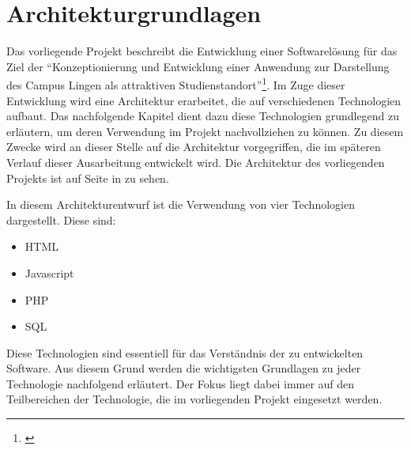 \section{Architekturgrundlagen}
\label{sec:Architekturgrundlagen}

Das vorliegende Projekt beschreibt die Entwicklung einer Softwarelösung für das
Ziel der "`Konzeptionierung und Entwicklung einer Anwendung zur Darstellung
des Campus Lingen als attraktiven
Studienstandort"'\footnote{\citet[S.~5]{unternehmensfuehrung2014}}.
Im Zuge dieser Entwicklung wird eine Architektur erarbeitet, die auf
verschiedenen Technologien aufbaut. Das nachfolgende Kapitel dient dazu diese
Technologien grundlegend zu erläutern, um deren Verwendung im Projekt
nachvollziehen zu können. Zu diesem Zwecke wird an dieser Stelle auf
die Architektur vorgegriffen, die im späteren Verlauf dieser Ausarbeitung
entwickelt wird. Die Architektur des vorliegenden Projekts ist auf Seite
\pageref{fig:Architektur} in  zu sehen.

In diesem Architekturentwurf ist die Verwendung von vier Technologien
dargestellt.
Diese sind:

\begin{itemize}
  \item HTML
  \item Javascript
  \item PHP
  \item SQL
\end{itemize}

Diese Technologien sind essentiell für das Verständnis der zu entwickelten
Software. Aus diesem Grund werden die wichtigsten Grundlagen zu jeder
Technologie nachfolgend erläutert. Der Fokus liegt dabei immer auf den
Teilbereichen der Technologie, die im vorliegenden Projekt eingesetzt werden.




